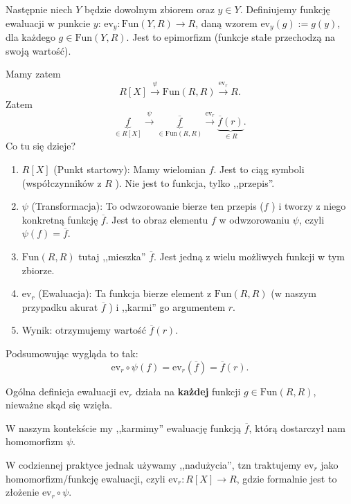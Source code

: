 Następnie niech $Y$ będzie dowolnym zbiorem oraz  $y \in Y$. Definiujemy funkcję ewaluacji w punkcie $y$: $\text{ev}_{y}: \text{Fun}\left( Y, R \right) \to R$, daną wzorem $\text{ev}_{y}\left( g \right) := g\left( y \right) $, dla każdego $g \in \text{Fun}\left( Y,R \right) $. Jest to epimorfizm (funkcje stałe przechodzą na swoją wartość).  

Mamy zatem
\[
R\left[ X \right] \overset{\psi}{\longrightarrow } \text{Fun}\left( R,R \right) \overset{\text{ev}_{r}}{\longrightarrow } R
.\] 
Zatem
\[
\underbrace{f}_{\in R\left[ X \right] } \overset{\psi}{\longrightarrow } \underbrace{\overline{f}}_{\in \text{Fun}\left( R,R \right) } \overset{\text{ev}_{r}}{\longrightarrow } \underbrace{\overline{f}\left( r \right) }_{\in R}
.\] 
Co tu się dzieje?
\begin{enumerate}[label=\arabic*)]
	\item $R\left[ X \right] $ (Punkt startowy): Mamy wielomian $f$. Jest to ciąg symboli (współczynników z $R$ ). Nie jest to funkcja, tylko ,,przepis''.
	\item $\psi$ (Transformacja): To odwzorowanie bierze ten przepis ($f$ ) i tworzy z niego konkretną funkcję $\overline{f}$. Jest to obraz elementu $f$ w odwzorowaniu $\psi$, czyli $\psi\left( f \right) = \overline{f}$.
	\item $\text{Fun}\left( R,R \right) $ tutaj ,,mieszka'' $\overline{f}$. Jest jedną z wielu możliwych funkcji w tym zbiorze.
	\item $\text{ev}_{r}$ (Ewaluacja): Ta funkcja bierze element z $\text{Fun}\left( R,R \right) $ (w naszym przypadku akurat  $\overline{f}$ ) i ,,karmi'' go argumentem $r$.
	\item Wynik: otrzymujemy wartość $\overline{f}\left( r \right) $.
\end{enumerate}
\noindent Podsumowując wygląda to tak:
\[
\text{ev}_{r} \circ \psi\left( f \right) = \text{ev}_{r}\left( \overline{f} \right) = \overline{f}\left( r \right) 
.\] 

Ogólna definicja ewaluacji $\text{ev}_{r}$ działa na \textbf{każdej} funkcji $g \in \text{Fun}\left( R,R \right) $, nieważne skąd się wzięła. 

W naszym kontekście my ,,karmimy'' ewaluację funkcją $\overline{f}$, którą dostarczył nam homomorfizm $\psi$.

W codziennej praktyce jednak używamy ,,nadużycia'', tzn traktujemy $\text{ev}_{r}$ jako homomorfizm/funkcję ewaluacji, czyli $\text{ev}_{r}: R\left[ X \right] \to R$, gdzie formalnie jest to złożenie $\text{ev}_{r} \circ \psi$.


